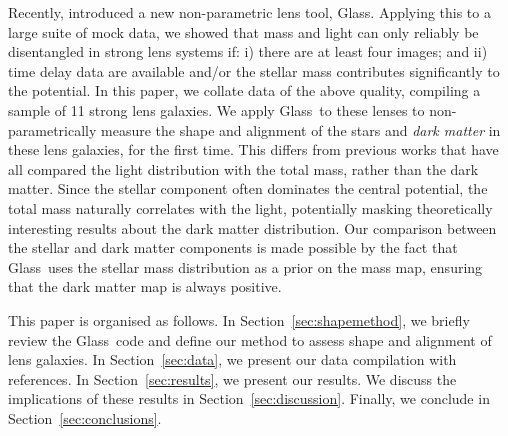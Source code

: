 \documentclass[useAMS,usenatbib]{mn2e}
\def\Glass{{\sc Glass}}
\begin{document}

Recently, \citet{2014MNRAS.445.2181C} introduced a new non-parametric lens tool, \Glass. Applying this to a large suite of mock data, we showed that mass and light can only reliably be disentangled in strong lens systems if: i) there are at least four images; and ii) time delay data are available and/or the stellar mass contributes significantly to the potential. In this paper, we collate data of the above quality, compiling a sample of 11 strong lens galaxies. We apply \Glass\ to these lenses to non-parametrically measure the shape and alignment of the stars and {\it dark matter} in these lens galaxies, for the first time. This differs from previous works that have all compared the light distribution with the total mass, rather than the dark matter. Since the stellar component often dominates the central potential, the total mass naturally correlates with the light, potentially masking theoretically interesting results about the dark matter distribution. Our comparison between the stellar and dark matter components is made possible by the fact that \Glass\ uses the stellar mass distribution as a prior on the mass map, ensuring that the dark matter map is always positive.

This paper is organised as follows. In Section~\ref{sec:shapemethod}, we briefly review the \Glass\ code and define our method to assess shape and alignment of lens galaxies. In Section~\ref{sec:data}, we present our data compilation with references. In Section~\ref{sec:results}, we present our results. We discuss the implications of these results in Section~\ref{sec:discussion}. Finally, we conclude in Section~\ref{sec:conclusions}.
\end{document}
